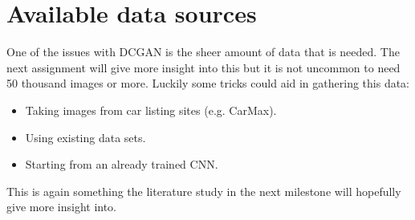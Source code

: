 
\section{Available data sources}
\label{sec:data_sources}

One of the issues with DCGAN is the sheer amount of data that is needed.
The next assignment will give more insight into this but it is not uncommon to need 50 thousand images or more.
Luckily some tricks could aid in gathering this data:
\begin{itemize}
    \item Taking images from car listing sites (e.g. CarMax).
    \item Using existing data sets.
    \item Starting from an already trained CNN.
\end{itemize}

This is again something the literature study in the next milestone will hopefully give more insight into.